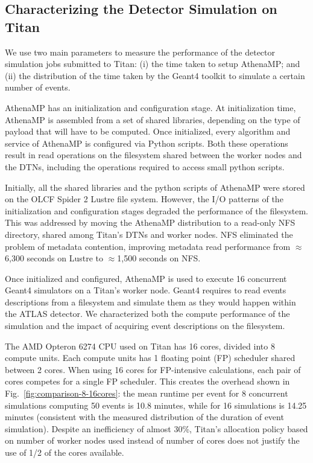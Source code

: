 \subsection{Characterizing the Detector Simulation on Titan}
\label{ssec:athenamp_titan}

We use two main parameters to measure the performance of the detector
simulation jobs submitted to Titan: (i) the time taken to setup AthenaMP\@;
and (ii) the distribution of the time taken by the Geant4 toolkit to simulate
a certain number of events.

AthenaMP has an initialization and configuration stage. At initialization
time, AthenaMP is assembled from a set of shared libraries, depending on the
type of payload that will have to be computed. Once initialized, every
algorithm and service of AthenaMP is configured via Python scripts. Both
these operations result in read operations on the filesystem shared between
the worker nodes and the DTNs, including the operations required to access
small python scripts.

Initially, all the shared libraries and the python scripts of AthenaMP were
stored on the OLCF Spider 2 Lustre file system. However, the I/O patterns of
the initialization and configuration stages degraded the performance of the
filesystem. This was addressed by moving the AthenaMP distribution to a
read-only NFS directory, shared among Titan's DTNs and worker nodes. NFS
eliminated the problem of metadata contention, improving metadata read
performance from $\approx$6,300 seconds on Lustre to $\approx$1,500 seconds
on NFS\@.

Once initialized and configured, AthenaMP is used to execute 16 concurrent
Geant4 simulators on a Titan's worker node. Geant4 requires to read events
descriptions from a filesystem and simulate them as they would happen within
the ATLAS detector. We characterized both the compute performance of the
simulation and the impact of acquiring event descriptions on the filesystem.

The AMD Opteron 6274 CPU used on Titan has 16 cores, divided into 8 compute
units. Each compute units has 1 floating point (FP) scheduler shared between
2 cores. When using 16 cores for FP-intensive calculations, each pair of
cores competes for a single FP scheduler. This creates the overhead shown in
Fig.~\ref{fig:comparison-8-16cores}: the mean runtime per event for 8
concurrent simulations computing 50 events is 10.8 minutes, while for 16
simulations is 14.25 minutes (consistent with the measured distribution of
the duration of event simulation). Despite an inefficiency of almost 30\%,
Titan's allocation policy based on number of worker nodes used instead of
number of cores does not justify the use of 1/2 of the cores available.

